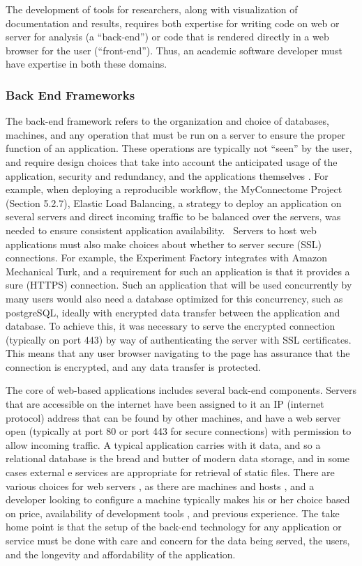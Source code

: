\documentclass{report}
\begin{document}
The development of tools for researchers, along with visualization of
documentation and results, requires both expertise for writing code on
web or server for analysis (a ``back-end'') or code that is rendered
directly in a web browser for the user (``front-end''). Thus, an
academic software developer must have expertise in both these domains.

\subsubsection{Back End Frameworks}

The back-end framework refers to the organization and choice of
databases, machines, and any operation that must be run on a server to
ensure the proper function of an application. These operations are
typically not ``seen'' by the user, and require design choices that take
into account the anticipated usage of the application, security and
redundancy, and the applications themselves \cite{Murty2008-xr}.
For example, when deploying a reproducible workflow, the MyConnectome
Project (Section 5.2.7), Elastic Load Balancing, a strategy to deploy an
application on several servers and direct incoming traffic to be
balanced over the servers, was needed to ensure consistent application
availability. ~Servers to host web applications must also make choices
about whether to server secure (SSL) connections. For example, the
Experiment Factory integrates with Amazon Mechanical Turk, and a
requirement for such an application is that it provides a sure (HTTPS)
connection. Such an application that will be used concurrently by many
users would also need a database optimized for this concurrency, such as
postgreSQL, ideally with encrypted data transfer between the application
and database. To achieve this, it was necessary to serve the encrypted
connection (typically on port 443) by way of authenticating the server
with SSL certificates. This means that any user browser navigating to
the page has assurance that the connection is encrypted, and any data
transfer is protected.

The core of web-based applications includes several back-end components.
Servers that are accessible on the internet have been assigned to it an
IP (internet protocol) address that can be found by other machines, and
have a web server open (typically at port 80 or port 443 for secure
connections) with permission to allow incoming traffic. A typical
application carries with it data, and so a relational database \cite{Smith2010-il,DuBois2008-vl} is
the bread and butter of modern data storage, and in some cases external
e services \cite{Murty2008-xr,Wheeler2015-nv} are
appropriate for retrieval of static files. There are various choices for
web servers \cite{noauthor_undated-rk},
as there are machines and hosts \cite{noauthor_undated-yg},
and a developer looking to configure a machine typically makes his or
her choice based on price, availability of development tools \cite{noauthor_undated-rq},
and previous experience. The take home point is that the setup of the
back-end technology for any application or service must be done with
care and concern for the data being served, the users, and the longevity
and affordability of the application.
\end{document}

